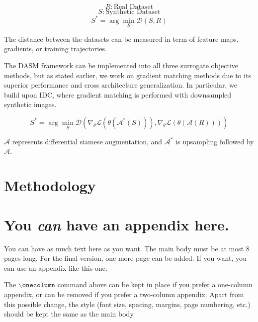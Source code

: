 \documentclass{article}
\theoremstyle{plain}
\theoremstyle{definition}
\theoremstyle{remark}
\begin{document}
\begin{equation}
R: \text{Real Dataset}
\end{equation}
\begin{equation}
S: \text{Synthetic Dataset}
\end{equation}
\begin{equation}
S^* = \arg \min_{S} \mathcal{D}(S,R)
\end{equation}

The distance between the datasets can be measured in term of feature maps, gradients, or training trajectories. 

The  DASM framework can be implemented into all three surrogate objective methods, but as stated earlier, we work on gradient matching methods due to its superior performance and cross architecture generalization. In particular, we build upon IDC, where gradient matching is performed with downsampled synthetic images.

\begin{equation}
S^* = \arg \min_{S} \mathcal{D} \left( \nabla_{\theta} \mathcal{L}(\theta(\mathcal{A}^*(S))), \nabla_{\theta} \mathcal{L}(\theta(\mathcal{A}(R))) \right)
\end{equation}

$\mathcal{A}$ represents differential siamese augmentation, and $\mathcal{A}^*$ is upsampling followed by $\mathcal{A}$.
\section{Methodology}




\nocite{langley00}





\newpage
\appendix
\onecolumn
\section{You \emph{can} have an appendix here.}

You can have as much text here as you want. The main body must be at most $8$ pages long.
For the final version, one more page can be added.
If you want, you can use an appendix like this one.  

The $\mathtt{\backslash onecolumn}$ command above can be kept in place if you prefer a one-column appendix, or can be removed if you prefer a two-column appendix.  Apart from this possible change, the style (font size, spacing, margins, page numbering, etc.) should be kept the same as the main body.
\end{document}

